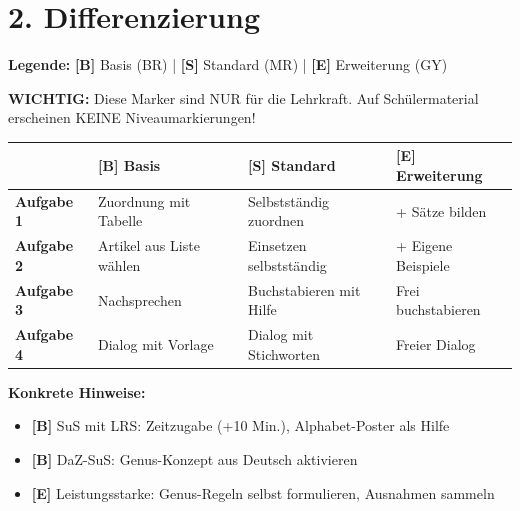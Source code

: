 \documentclass[11pt, a4paper]{article}
\newcommand{\B}{\textcolor{basis}{\textbf{[B]}}}
\newcommand{\Std}{\textcolor{standard}{\textbf{[S]}}}
\newcommand{\E}{\textcolor{erweiterung}{\textbf{[E]}}}
\begin{document}

\section*{2. Differenzierung}

\begin{differenzierung}
\textbf{Legende:} \B{} Basis (BR) | \Std{} Standard (MR) | \E{} Erweiterung (GY)

\vspace{0.5em}

\textbf{WICHTIG:} Diese Marker sind NUR für die Lehrkraft. Auf Schülermaterial erscheinen KEINE Niveaumarkierungen!
\end{differenzierung}

\vspace{1em}

\begin{tabularx}{\textwidth}{|l|X|X|X|}
\hline
& \B{} \textbf{Basis} & \Std{} \textbf{Standard} & \E{} \textbf{Erweiterung} \\
\hline
\textbf{Aufgabe 1} & Zuordnung mit Tabelle & Selbstständig zuordnen & + Sätze bilden \\
\hline
\textbf{Aufgabe 2} & Artikel aus Liste wählen & Einsetzen selbstständig & + Eigene Beispiele \\
\hline
\textbf{Aufgabe 3} & Nachsprechen & Buchstabieren mit Hilfe & Frei buchstabieren \\
\hline
\textbf{Aufgabe 4} & Dialog mit Vorlage & Dialog mit Stichworten & Freier Dialog \\
\hline
\end{tabularx}

\vspace{1em}

\textbf{Konkrete Hinweise:}
\begin{itemize}
    \item \B{} SuS mit LRS: Zeitzugabe (+10 Min.), Alphabet-Poster als Hilfe
    \item \B{} DaZ-SuS: Genus-Konzept aus Deutsch aktivieren
    \item \E{} Leistungsstarke: Genus-Regeln selbst formulieren, Ausnahmen sammeln
\end{itemize}

\end{document}
